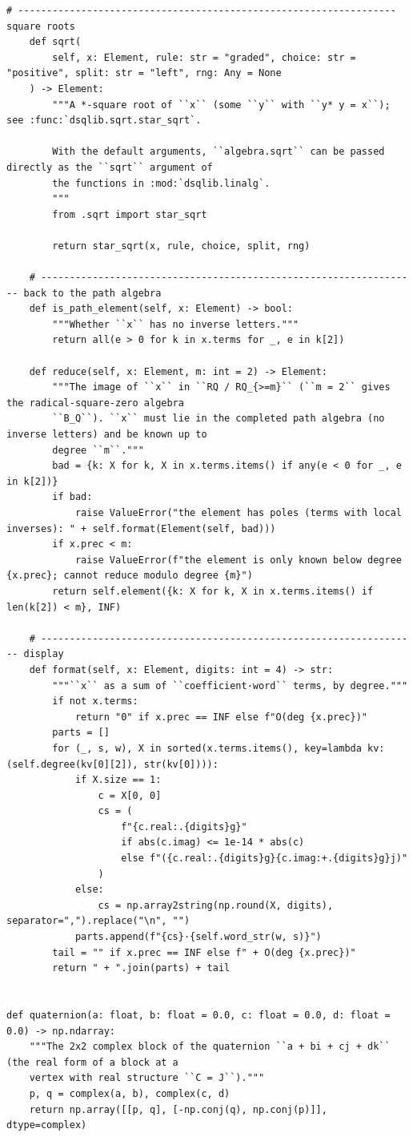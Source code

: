 \documentclass[12pt, a4paper]{report}
\theoremstyle{plain}
\theoremstyle{definition}
\theoremstyle{remark}
\theoremstyle{plain}
\begin{document}
\begin{lstlisting}[style=dsqcode]
    # ------------------------------------------------------------------ square roots
    def sqrt(
        self, x: Element, rule: str = "graded", choice: str = "positive", split: str = "left", rng: Any = None
    ) -> Element:
        """A *-square root of ``x`` (some ``y`` with ``y* y = x``); see :func:`dsqlib.sqrt.star_sqrt`.

        With the default arguments, ``algebra.sqrt`` can be passed directly as the ``sqrt`` argument of
        the functions in :mod:`dsqlib.linalg`.
        """
        from .sqrt import star_sqrt

        return star_sqrt(x, rule, choice, split, rng)

    # ------------------------------------------------------------------ back to the path algebra
    def is_path_element(self, x: Element) -> bool:
        """Whether ``x`` has no inverse letters."""
        return all(e > 0 for k in x.terms for _, e in k[2])

    def reduce(self, x: Element, m: int = 2) -> Element:
        """The image of ``x`` in ``RQ / RQ_{>=m}`` (``m = 2`` gives the radical-square-zero algebra
        ``B_Q``). ``x`` must lie in the completed path algebra (no inverse letters) and be known up to
        degree ``m``."""
        bad = {k: X for k, X in x.terms.items() if any(e < 0 for _, e in k[2])}
        if bad:
            raise ValueError("the element has poles (terms with local inverses): " + self.format(Element(self, bad)))
        if x.prec < m:
            raise ValueError(f"the element is only known below degree {x.prec}; cannot reduce modulo degree {m}")
        return self.element({k: X for k, X in x.terms.items() if len(k[2]) < m}, INF)

    # ------------------------------------------------------------------ display
    def format(self, x: Element, digits: int = 4) -> str:
        """``x`` as a sum of ``coefficient·word`` terms, by degree."""
        if not x.terms:
            return "0" if x.prec == INF else f"O(deg {x.prec})"
        parts = []
        for (_, s, w), X in sorted(x.terms.items(), key=lambda kv: (self.degree(kv[0][2]), str(kv[0]))):
            if X.size == 1:
                c = X[0, 0]
                cs = (
                    f"{c.real:.{digits}g}"
                    if abs(c.imag) <= 1e-14 * abs(c)
                    else f"({c.real:.{digits}g}{c.imag:+.{digits}g}j)"
                )
            else:
                cs = np.array2string(np.round(X, digits), separator=",").replace("\n", "")
            parts.append(f"{cs}·{self.word_str(w, s)}")
        tail = "" if x.prec == INF else f" + O(deg {x.prec})"
        return " + ".join(parts) + tail


def quaternion(a: float, b: float = 0.0, c: float = 0.0, d: float = 0.0) -> np.ndarray:
    """The 2x2 complex block of the quaternion ``a + bi + cj + dk`` (the real form of a block at a
    vertex with real structure ``C = J``)."""
    p, q = complex(a, b), complex(c, d)
    return np.array([[p, q], [-np.conj(q), np.conj(p)]], dtype=complex)
\end{lstlisting}
\end{document}
